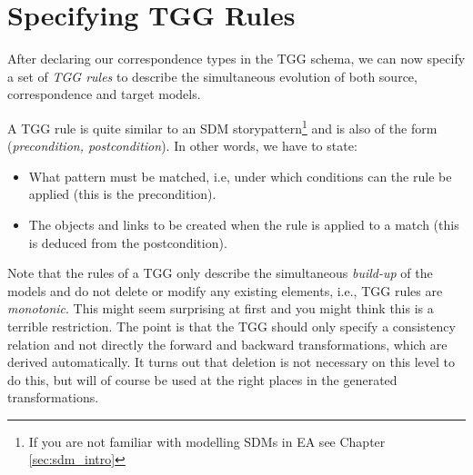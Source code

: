 \section{Specifying TGG Rules}

After declaring our correspondence types in the TGG schema, we can now specify a set of \emph{TGG rules} to describe the simultaneous evolution of both source, correspondence and target models.

A TGG rule is quite similar to an SDM storypattern\footnote{If you are not familiar with modelling SDMs in EA see Chapter \ref{sec:sdm_intro}} and is also of the form (\emph{precondition, postcondition}).
In other words, we have to state:
\begin{itemize}
  \item What pattern must be matched, i.e, under which conditions can the rule be applied (this is the precondition).
  \item The objects and links to be created when the rule is applied to a match (this is deduced from the postcondition). 
\end{itemize}

Note that the rules of a TGG only describe the simultaneous \emph{build-up} of the models and do not delete or modify any existing elements, i.e., TGG rules are \emph{monotonic}.
This might seem surprising at first and you might think this is a terrible restriction.
The point is that the TGG should only specify a consistency relation and not directly the forward and backward transformations, which are derived automatically. 
It turns out that deletion is not necessary on this level to do this, but will of course be used at the right places in the generated transformations. 

